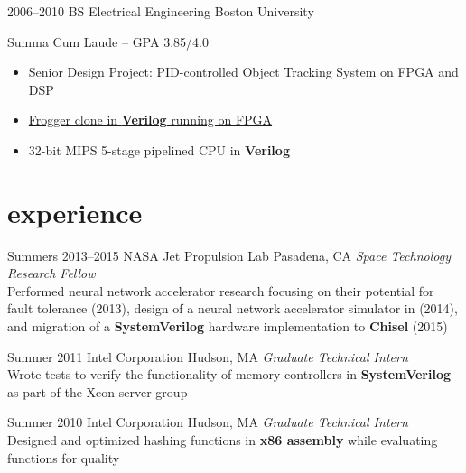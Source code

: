 \documentclass[print]{friggeri-cv} %
\begin{document}
\begin{entrylist}

\entry
{2006--2010}
{BS {\normalfont Electrical Engineering}}
{Boston University}
{Summa Cum Laude -- GPA 3.85/4.0
  \begin{itemize}
  \item Senior Design Project: PID-controlled Object Tracking System on FPGA and DSP
  \item \href{https://www.youtube.com/watch?v=S2LgUL5JLqQ}{Frogger clone in \textbf{Verilog} running on FPGA}
  \item 32-bit MIPS 5-stage pipelined CPU in \textbf{Verilog}
  \end{itemize}
}


\end{entrylist}


\section{experience}


\begin{entrylist}


\entry
{Summers 2013--2015}
{NASA Jet Propulsion Lab}
{Pasadena, CA}
{\emph{Space Technology Research Fellow}\\
  Performed neural network accelerator research focusing on their potential for fault tolerance (2013), design of a neural network accelerator simulator in \textbf{\CPP} (2014), and migration of a \textbf{SystemVerilog} hardware implementation to \textbf{Chisel} (2015)}

\entry
{Summer 2011}
{Intel Corporation}
{Hudson, MA}
{\emph{Graduate Technical Intern} \\
  Wrote tests to verify the functionality of memory controllers in \textbf{SystemVerilog} as part of the Xeon server group
}

\entry
{Summer 2010}
{Intel Corporation}
{Hudson, MA}
{\emph{Graduate Technical Intern} \\
  Designed and optimized hashing functions in \textbf{x86 assembly} while evaluating functions for quality
}


\end{entrylist}
\end{document}
